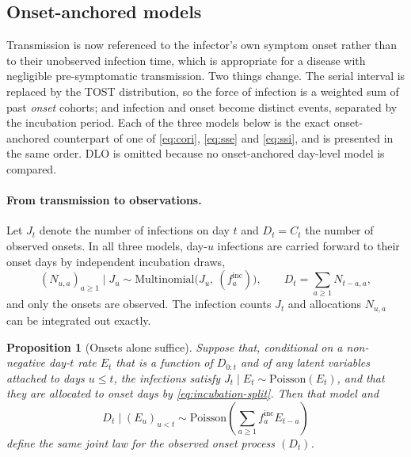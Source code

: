 \documentclass[11pt,a4paper]{article}
\theoremstyle{plain}
\newtheorem{proposition}{Proposition}
\theoremstyle{definition}
\newcommand{\finc}{f^{\mathrm{inc}}}
\newcommand{\Pois}{\mathrm{Poisson}}
\newcommand{\dlo}{DLO}
\begin{document}
\subsection{Onset-anchored models}
\label{sec:onset-models}

Transmission is now referenced to the infector's own symptom onset rather than to their
unobserved infection time, which is appropriate for a disease with negligible pre-symptomatic
transmission. Two things change. The serial interval is replaced by the TOST distribution, so the
force of infection is a weighted sum of past \emph{onset} cohorts; and infection and onset become
distinct events, separated by the incubation period. Each of the three models below is the exact
onset-anchored counterpart of one of \eqref{eq:cori}, \eqref{eq:sse} and \eqref{eq:ssi}, and is
presented in the same order. \dlo{} is omitted because no onset-anchored day-level model is
compared.

\paragraph{From transmission to observations.} Let $J_t$ denote the number of infections on day
$t$ and $D_t=C_t$ the number of observed onsets. In all three models, day-$u$ infections are
carried forward to their onset days by independent incubation draws,
\begin{equation}
  (N_{u,a})_{a\ge1} \mid J_u \sim \mathrm{Multinomial}\bigl(J_u,\ (\finc_a)\bigr),
  \qquad
  D_t = \sum_{a\ge1} N_{t-a,a},
  \label{eq:incubation-split}
\end{equation}
and only the onsets are observed. The infection counts $J_t$ and allocations $N_{u,a}$ can be
integrated out exactly.

\begin{proposition}[Onsets alone suffice]
\label{prop:equivalence}
Suppose that, conditional on a non-negative day-$t$ rate $E_t$ that is a function of
$D_{0:t}$ and of any latent variables attached to days $u \le t$, the infections satisfy
$J_t \mid E_t \sim \Pois(E_t)$, and that they are allocated to onset days by
\eqref{eq:incubation-split}. Then that model and
\begin{equation}
  D_t \mid (E_u)_{u<t} \sim \Pois\!\left(\sum_{a\ge1}\finc_a E_{t-a}\right)
  \label{eq:onset-step}
\end{equation}
define the same joint law for the observed onset process $(D_t)$.
\end{proposition}
\end{document}
